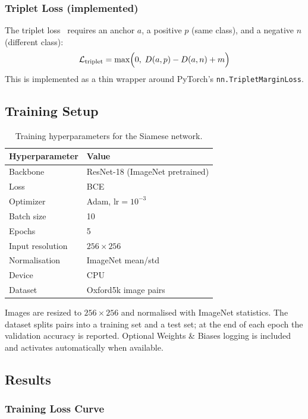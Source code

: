 \documentclass[11pt,letterpaper]{article}
\begin{document}
\subsubsection{Triplet Loss (implemented)}

The triplet loss~\cite{schroff2015} requires an anchor $a$, a positive $p$ (same class), and a negative $n$ (different class):
\[
\mathcal{L}_\text{triplet} = \max\Bigl(0,\; D(a,p) - D(a,n) + m\Bigr)
\]
This is implemented as a thin wrapper around PyTorch's \texttt{nn.TripletMarginLoss}.

\subsection{Training Setup}

\begin{table}[H]
  \centering
  \begin{tabular}{ll}
    \toprule
    \textbf{Hyperparameter} & \textbf{Value} \\
    \midrule
    Backbone & ResNet-18 (ImageNet pretrained) \\
    Loss & BCE \\
    Optimizer & Adam, $\text{lr}=10^{-3}$ \\
    Batch size & 10 \\
    Epochs & 5 \\
    Input resolution & $256\times256$ \\
    Normalisation & ImageNet mean/std \\
    Device & CPU \\
    Dataset & Oxford5k image pairs \\
    \bottomrule
  \end{tabular}
  \caption{Training hyperparameters for the Siamese network.}
  \label{tab:hyperparams}
\end{table}

Images are resized to $256\times256$ and normalised with ImageNet statistics. The dataset splits pairs into a training set and a test set; at the end of each epoch the validation accuracy is reported. Optional Weights \& Biases logging is included and activates automatically when available.

\subsection{Results}

\subsubsection{Training Loss Curve}
\end{document}
